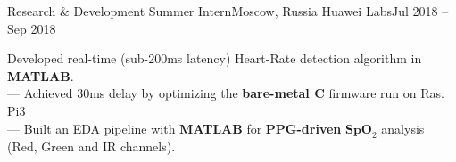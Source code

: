 \resumeSubheading
    {Research \& Development Summer Intern}{Moscow, Russia}
    {Huawei Labs}{Jul 2018 -- Sep 2018}
    \begin{itemize}[leftmargin=0in, label={}]
        \small{\item{
            {Developed real-time (sub-200ms latency) Heart-Rate detection algorithm in \textbf{MATLAB}.}\\
            {— Achieved 30ms delay by optimizing the \textbf{bare-metal C} firmware run on Ras. Pi3}\\
            {— Built an EDA pipeline with \textbf{MATLAB} for \textbf{PPG-driven} $\mathrm{\textbf{SpO}}_2$ analysis  (Red, Green and IR channels).}\\
        }}
    \end{itemize}
    